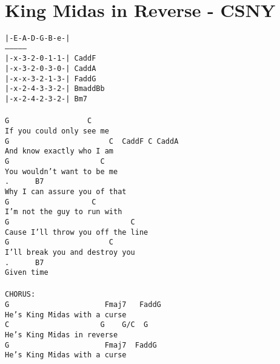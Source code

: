 \newpage
\section{King Midas in Reverse - CSNY}
\label{King Midas in Reverse - CSNY}
\texttt{|-E-A-D-G-B-e-|\\
---------------\\
|-x-3-2-0-1-1-|\ CaddF\\
|-x-3-2-0-3-0-|\ CaddA\\
|-x-x-3-2-1-3-|\ FaddG\\
|-x-2-4-3-3-2-|\ BmaddBb\\
|-x-2-4-2-3-2-|\ Bm7 \\
\\
G\ \ \ \ \ \ \ \ \ \ \ \ \ \ \ \ \ \ C\\
If\ you\ could\ only\ see\ me\\
G\ \ \ \ \ \ \ \ \ \ \ \ \ \ \ \ \ \ \ \ \ \ \ C\ \ CaddF\ C\ CaddA\\
And\ know\ exactly\ who\ I\ am\\
G\ \ \ \ \ \ \ \ \ \ \ \ \ \ \ \ \ \ \ \ \ C\\
You\ wouldn't\ want\ to\ be\ me\\
.\ \ \ \ \ \ B7\\
Why\ I\ can\ assure\ you\ of\ that\\
G\ \ \ \ \ \ \ \ \ \ \ \ \ \ \ \ \ \ \ C\\
I'm\ not\ the\ guy\ to\ run\ with\\
G\ \ \ \ \ \ \ \ \ \ \ \ \ \ \ \ \ \ \ \ \ \ \ \ \ \ \ \ C\\
Cause\ I'll\ throw\ you\ off\ the\ line\\
G\ \ \ \ \ \ \ \ \ \ \ \ \ \ \ \ \ \ \ \ \ \ \ C\\
I'll\ break\ you\ and\ destroy\ you\\
.\ \ \ \ \ \ B7\\
Given\ time\\
\\
CHORUS:\\
G\ \ \ \ \ \ \ \ \ \ \ \ \ \ \ \ \ \ \ \ \ \ Fmaj7\ \ \ FaddG\\
He's\ King\ Midas\ with\ a\ curse\\
C\ \ \ \ \ \ \ \ \ \ \ \ \ \ \ \ \ \ \ \ \ G\ \ \ \ G/C\ \ G\\
He's\ King\ Midas\ in\ reverse\\
G\ \ \ \ \ \ \ \ \ \ \ \ \ \ \ \ \ \ \ \ \ \ Fmaj7\ \ FaddG\\
He's\ King\ Midas\ with\ a\ curse\\
}
